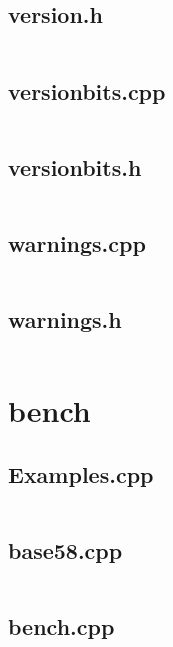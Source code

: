 \documentclass{article}
\begin{document}
\subsection{version.h}
\inputminted{cpp}{/home/dufferzafar/dev/@clones/bitcoin/src/version.h}
\newpage

\subsection{versionbits.cpp}
\inputminted{cpp}{/home/dufferzafar/dev/@clones/bitcoin/src/versionbits.cpp}
\newpage

\subsection{versionbits.h}
\inputminted{cpp}{/home/dufferzafar/dev/@clones/bitcoin/src/versionbits.h}
\newpage

\subsection{warnings.cpp}
\inputminted{cpp}{/home/dufferzafar/dev/@clones/bitcoin/src/warnings.cpp}
\newpage

\subsection{warnings.h}
\inputminted{cpp}{/home/dufferzafar/dev/@clones/bitcoin/src/warnings.h}
\newpage

\section{bench}

\subsection{Examples.cpp}
\inputminted{cpp}{/home/dufferzafar/dev/@clones/bitcoin/src/bench/Examples.cpp}
\newpage

\subsection{base58.cpp}
\inputminted{cpp}{/home/dufferzafar/dev/@clones/bitcoin/src/bench/base58.cpp}
\newpage

\subsection{bench.cpp}
\inputminted{cpp}{/home/dufferzafar/dev/@clones/bitcoin/src/bench/bench.cpp}
\newpage
\end{document}

